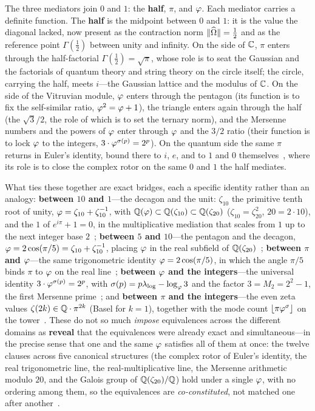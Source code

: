 The three mediators join $0$ and $1$: the \textbf{half}, $\pi$, and $\varphi$. Each mediator carries a definite function. The \textbf{half} is the midpoint between $0$ and $1$: it is the value the diagonal lacked, now present as the contraction norm $\|\widehat{\Omega}\|=\tfrac12$ and as the reference point $\Gamma(\tfrac12)$ between unity and infinity. On the side of $\mathbb{C}$, $\pi$ enters through the half-factorial $\Gamma(\tfrac12)=\sqrt\pi$, whose role is to seat the Gaussian and the factorials of quantum theory and string theory on the circle itself; the circle, carrying the half, meets $i$---the Gaussian lattice and the modulus of $\mathbb{C}$. On the side of the Vitruvian module, $\varphi$ enters through the pentagon (its function is to fix the self-similar ratio, $\varphi^2=\varphi+1$), the triangle enters again through the half (the $\sqrt3/2$, the role of which is to set the ternary norm), and the Mersenne numbers and the powers of $\varphi$ enter through $\varphi$ and the $3/2$ ratio (their function is to lock $\varphi$ to the integers, $3\cdot\varphi^{\sigma(p)}=2^p$). On the quantum side the same $\pi$ returns in Euler's identity, bound there to $i$, $e$, and to $1$ and $0$ themselves~\cite{Corr}, where its role is to close the complex rotor on the same $0$ and $1$ the half mediates.

What ties these together are exact bridges, each a specific identity rather than an analogy: \textbf{between $10$ and $1$}---the decagon and the unit: $\zeta_{10}$ the primitive tenth root of unity, $\varphi=\zeta_{10}+\zeta_{10}^{-1}$, with $\mathbb{Q}(\varphi)\subset\mathbb{Q}(\zeta_{10})\subset\mathbb{Q}(\zeta_{20})$ ($\zeta_{10}=\zeta_{20}^2$, $20=2\cdot10$), and the $1$ of $e^{i\pi}+1=0$, in the multiplicative mediation that scales from $1$ up to the next integer base $2$~\cite{Corr}; \textbf{between $5$ and $10$}---the pentagon and the decagon, $\varphi=2\cos(\pi/5)=\zeta_{10}+\zeta_{10}^{-1}$, placing $\varphi$ in the real subfield of $\mathbb{Q}(\zeta_{20})$~\cite{Corr}; \textbf{between $\pi$ and $\varphi$}---the same trigonometric identity $\varphi=2\cos(\pi/5)$, in which the angle $\pi/5$ binds $\pi$ to $\varphi$ on the real line~\cite{Corr}; \textbf{between $\varphi$ and the integers}---the universal identity $3\cdot\varphi^{\sigma(p)}=2^p$, with $\sigma(p)=p\lambda_{\log}-\log_\varphi 3$ and the factor $3=M_2=2^2-1$, the first Mersenne prime~\cite{Corr,F1}; and \textbf{between $\pi$ and the integers}---the even zeta values $\zeta(2k)\in\mathbb{Q}\cdot\pi^{2k}$ (Basel for $k=1$), together with the mode count $\lfloor\pi\varphi^\sigma\rfloor$ on the tower~\cite{F1}. These do not so much \emph{impose} equivalences across the different domains as \textbf{reveal} that the equivalences were already exact and simultaneous---in the precise sense that one and the same $\varphi$ satisfies all of them at once: the twelve clauses across five canonical structures (the complex rotor of Euler's identity, the real trigonometric line, the real-multiplicative line, the Mersenne arithmetic modulo $20$, and the Galois group of $\mathbb{Q}(\zeta_{20})/\mathbb{Q}$) hold under a single $\varphi$, with no ordering among them, so the equivalences are \emph{co-constituted}, not matched one after another~\cite{Corr}.

